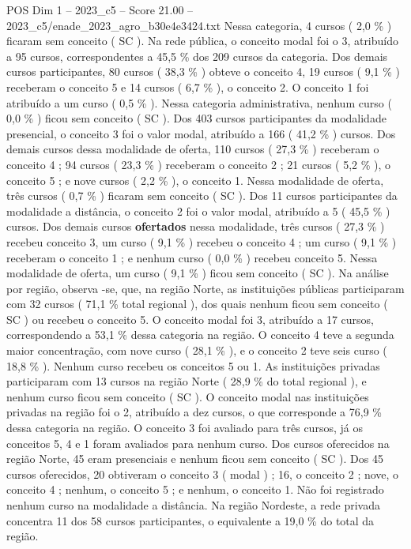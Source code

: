 \begin{textsample}{POS Dim 1 – 2023\_c5 – Score 21.00 – 2023\_c5/enade\_2023\_agro\_b30e4e3424.txt}
Nessa categoria, 4 cursos ( 2,0 \% ) ficaram sem conceito ( SC ).
Na rede pública, o conceito modal foi o 3, atribuído a 95 cursos, correspondentes a 45,5 \% dos 209 cursos da categoria.
Dos demais cursos participantes, 80 cursos ( 38,3 \% ) obteve o conceito 4, 19 cursos ( 9,1 \% ) receberam o conceito 5 e 14 cursos ( 6,7 \% ), o conceito 2.
O conceito 1 foi atribuído a um curso ( 0,5 \% ).
Nessa categoria administrativa, nenhum curso ( 0,0 \% ) ficou sem conceito ( SC ).
Dos 403 cursos participantes da modalidade presencial, o conceito 3 foi o valor modal, atribuído a 166 ( 41,2 \% ) cursos.
Dos demais cursos dessa modalidade de oferta, 110 cursos ( 27,3 \% ) receberam o conceito 4 ; 94 cursos ( 23,3 \% ) receberam o conceito 2 ; 21 cursos ( 5,2 \% ), o conceito 5 ; e nove cursos ( 2,2 \% ), o conceito 1.
Nessa modalidade de oferta, três cursos ( 0,7 \% ) ficaram sem conceito ( SC ).
Dos 11 cursos participantes da modalidade a distância, o conceito 2 foi o valor modal, atribuído a 5 ( 45,5 \% ) cursos.
Dos demais cursos \textbf{ofertados} nessa modalidade, três cursos ( 27,3 \% ) recebeu conceito 3, um curso ( 9,1 \% ) recebeu o conceito 4 ; um curso ( 9,1 \% ) receberam o conceito 1 ; e nenhum curso ( 0,0 \% ) recebeu conceito 5.
Nessa modalidade de oferta, um curso ( 9,1 \% ) ficou sem conceito ( SC ).
Na análise por região, observa -se, que, na região Norte, as instituições públicas participaram com 32 cursos ( 71,1 \% total regional ), dos quais nenhum ficou sem conceito ( SC ) ou recebeu o conceito 5.
O conceito modal foi 3, atribuído a 17 cursos, correspondendo a 53,1 \% dessa categoria na região.
O conceito 4 teve a segunda maior concentração, com nove curso ( 28,1 \% ), e o conceito 2 teve seis curso ( 18,8 \% ).
Nenhum curso recebeu os conceitos 5 ou 1.
As instituições privadas participaram com 13 cursos na região Norte ( 28,9 \% do total regional ), e nenhum curso ficou sem conceito ( SC ).
O conceito modal nas instituições privadas na região foi o 2, atribuído a dez cursos, o que corresponde a 76,9 \% dessa categoria na região.
O conceito 3 foi avaliado para três cursos, já os conceitos 5, 4 e 1 foram avaliados para nenhum curso.
Dos cursos oferecidos na região Norte, 45 eram presenciais e nenhum ficou sem conceito ( SC ).
Dos 45 cursos oferecidos, 20 obtiveram o conceito 3 ( modal ) ; 16, o conceito 2 ; nove, o conceito 4 ; nenhum, o conceito 5 ; e nenhum, o conceito 1.
Não foi registrado nenhum curso na modalidade a distância.
Na região Nordeste, a rede privada concentra 11 dos 58 cursos participantes, o equivalente a 19,0 \% do total da região.

\end{textsample}
